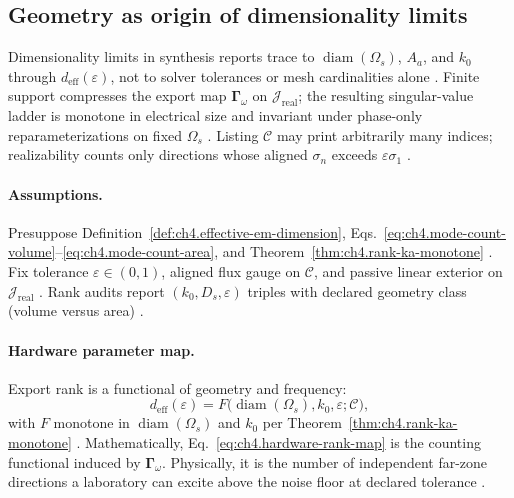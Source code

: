 ﻿\subsection{Geometry as origin of dimensionality limits}
\label{sec:ch491}

Dimensionality limits in synthesis reports trace to \(\operatorname{diam}(\Omega_{s})\), \(A_{a}\), and \(k_{0}\) through
\(d_{\mathrm{eff}}(\varepsilon)\), not to solver tolerances or mesh cardinalities alone \cite{stratton1941,jackson1999,hansen1988,harrington2001}.
Finite support compresses the export map \(\boldsymbol{\Gamma}_\omega\) on \(\mathcal{J}_{\mathrm{real}}\); the resulting singular-value ladder is
monotone in electrical size and invariant under phase-only reparameterizations on fixed \(\Omega_{s}\) \cite{devaney2004,harrington2001}. Listing
\(\mathcal{C}\) may print arbitrarily many indices; realizability counts only directions whose aligned \(\sigma_{n}\) exceeds \(\varepsilon\sigma_{1}\)
\cite{stratton1941,hansen1988}.

\paragraph{Assumptions.}
Presuppose Definition~\ref{def:ch4.effective-em-dimension}, Eqs.~\eqref{eq:ch4.mode-count-volume}--\eqref{eq:ch4.mode-count-area}, and
Theorem~\ref{thm:ch4.rank-ka-monotone} \cite{stratton1941,hansen1988,harrington2001,jackson1999}. Fix tolerance \(\varepsilon\in(0,1)\), aligned flux
gauge on \(\mathcal{C}\), and passive linear exterior on \(\mathcal{J}_{\mathrm{real}}\) \cite{devaney2004}. Rank audits report \((k_{0},D_{s},\varepsilon)\)
triples with declared geometry class (volume versus area) \cite{collin2001,stratton1941}.

\paragraph{Hardware parameter map.}
Export rank is a functional of geometry and frequency:
\begin{equation}
\label{eq:ch4.hardware-rank-map}
d_{\mathrm{eff}}(\varepsilon)=F\big(\operatorname{diam}(\Omega_{s}),k_{0},\varepsilon;\mathcal{C}\big),
\end{equation}
with \(F\) monotone in \(\operatorname{diam}(\Omega_{s})\) and \(k_{0}\) per Theorem~\ref{thm:ch4.rank-ka-monotone} \cite{stratton1941,jackson1999,hansen1988}.
Mathematically, Eq.~\eqref{eq:ch4.hardware-rank-map} is the counting functional induced by \(\boldsymbol{\Gamma}_\omega\). Physically, it is the number
of independent far-zone directions a laboratory can excite above the noise floor at declared tolerance \cite{harrington2001,devaney2004}.

